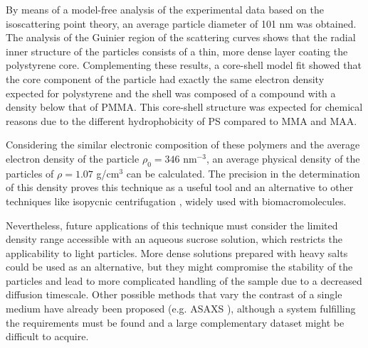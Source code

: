 By means of a model-free analysis of the experimental data based on the isoscattering point theory, an average particle diameter of 101 nm was obtained. The analysis of the Guinier region of the scattering curves shows that the radial inner structure of the particles consists of a thin, more dense layer coating the polystyrene core. Complementing these results, a core-shell model fit showed that the core component of the particle had exactly the same electron density expected for polystyrene and the shell was composed of a compound with a density below that of PMMA. This core-shell structure was expected for chemical reasons due to the different hydrophobicity of PS compared to MMA and MAA.

Considering the similar electronic composition of these polymers and the average electron density of the particle $\rho_0=346$ nm\(^{-3}\), an average physical density of the particles of $\rho=1.07$ g/cm\(^{3}\) can be calculated. The precision in the determination of this density proves this technique as a useful tool and an alternative to other techniques like isopycnic centrifugation \cite{vauthier_measurement_1999,arnold_sorting_2006,sun_separation_2009}, widely used with biomacromolecules.

Nevertheless, future applications of this technique must consider the limited density range accessible with an aqueous sucrose solution, which restricts the applicability to light particles. More dense solutions prepared with heavy salts could be used as an alternative, but they might compromise the stability of the particles and lead to more complicated handling of the sample due to a decreased diffusion timescale. Other possible methods that vary the contrast of a single medium have already been proposed (e.g. ASAXS \cite{stuhrmann_contrast_2007}), although a system fulfilling the requirements must be found and a large complementary dataset might be difficult to acquire.


\label{sec:results}

